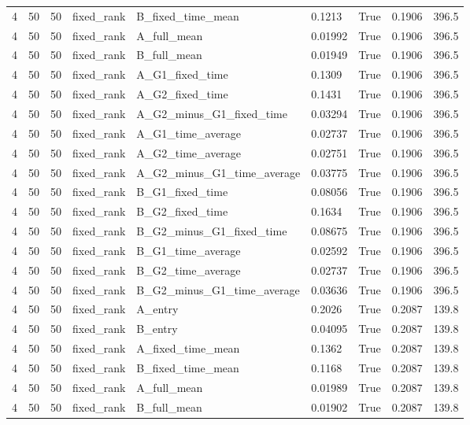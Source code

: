 \begin{longtable}{lllllllll}
4 & 50 & 50 & fixed\_rank & B\_fixed\_time\_mean & 0.1213 & True & 0.1906 & 396.5 \\
4 & 50 & 50 & fixed\_rank & A\_full\_mean & 0.01992 & True & 0.1906 & 396.5 \\
4 & 50 & 50 & fixed\_rank & B\_full\_mean & 0.01949 & True & 0.1906 & 396.5 \\
4 & 50 & 50 & fixed\_rank & A\_G1\_fixed\_time & 0.1309 & True & 0.1906 & 396.5 \\
4 & 50 & 50 & fixed\_rank & A\_G2\_fixed\_time & 0.1431 & True & 0.1906 & 396.5 \\
4 & 50 & 50 & fixed\_rank & A\_G2\_minus\_G1\_fixed\_time & 0.03294 & True & 0.1906 & 396.5 \\
4 & 50 & 50 & fixed\_rank & A\_G1\_time\_average & 0.02737 & True & 0.1906 & 396.5 \\
4 & 50 & 50 & fixed\_rank & A\_G2\_time\_average & 0.02751 & True & 0.1906 & 396.5 \\
4 & 50 & 50 & fixed\_rank & A\_G2\_minus\_G1\_time\_average & 0.03775 & True & 0.1906 & 396.5 \\
4 & 50 & 50 & fixed\_rank & B\_G1\_fixed\_time & 0.08056 & True & 0.1906 & 396.5 \\
4 & 50 & 50 & fixed\_rank & B\_G2\_fixed\_time & 0.1634 & True & 0.1906 & 396.5 \\
4 & 50 & 50 & fixed\_rank & B\_G2\_minus\_G1\_fixed\_time & 0.08675 & True & 0.1906 & 396.5 \\
4 & 50 & 50 & fixed\_rank & B\_G1\_time\_average & 0.02592 & True & 0.1906 & 396.5 \\
4 & 50 & 50 & fixed\_rank & B\_G2\_time\_average & 0.02737 & True & 0.1906 & 396.5 \\
4 & 50 & 50 & fixed\_rank & B\_G2\_minus\_G1\_time\_average & 0.03636 & True & 0.1906 & 396.5 \\
4 & 50 & 50 & fixed\_rank & A\_entry & 0.2026 & True & 0.2087 & 139.8 \\
4 & 50 & 50 & fixed\_rank & B\_entry & 0.04095 & True & 0.2087 & 139.8 \\
4 & 50 & 50 & fixed\_rank & A\_fixed\_time\_mean & 0.1362 & True & 0.2087 & 139.8 \\
4 & 50 & 50 & fixed\_rank & B\_fixed\_time\_mean & 0.1168 & True & 0.2087 & 139.8 \\
4 & 50 & 50 & fixed\_rank & A\_full\_mean & 0.01989 & True & 0.2087 & 139.8 \\
4 & 50 & 50 & fixed\_rank & B\_full\_mean & 0.01902 & True & 0.2087 & 139.8 \\

\end{longtable}
